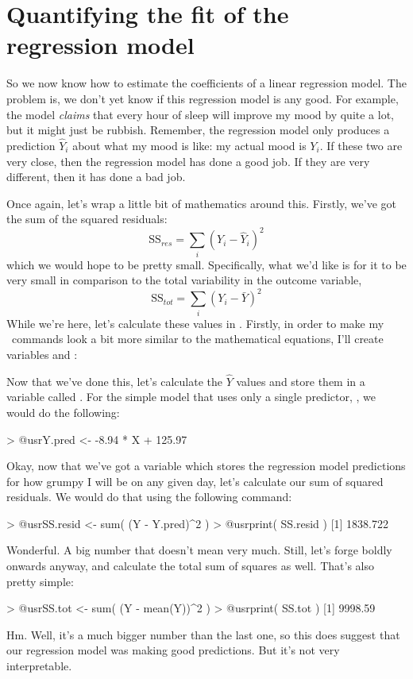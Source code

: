 \section{Quantifying the fit of the regression model~\label{sec:r2}}

So we now know how to estimate the coefficients of a linear regression model. The problem is, we don't yet know if this regression model is any good. For example, the  model {\it claims} that every hour of sleep will improve my mood by quite a lot, but it might just be rubbish. Remember, the regression model only produces a prediction $\hat{Y}_i$ about what my mood is like: my actual mood is $Y_i$. If these two are very close, then the regression model has done a good job. If they are very different, then it has done a bad job. 


Once again, let's wrap a little bit of mathematics around this. Firstly, we've got the sum of the squared residuals:
$$
\mbox{SS}_{res} = \sum_i (Y_i - \hat{Y}_i)^2
$$
which we would hope to be pretty small. Specifically, what we'd like is for it to be very small in comparison to the total variability in the outcome variable, 
$$
\mbox{SS}_{tot} = \sum_i (Y_i - \bar{Y})^2
$$
While we're here, let's calculate these values in \R. Firstly, in order to make my \R\ commands look a bit more similar to the mathematical equations, I'll create variables  and :
Now that we've done this, let's calculate the $\hat{Y}$ values and store them in a variable called . For the simple model that uses only a single predictor, , we would do the following:
\begin{rblock1}
> @usr{Y.pred <- -8.94 * X  +  125.97}
\end{rblock1}
Okay, now that we've got a variable which stores the regression model predictions for how grumpy I will be on any given day, let's calculate our sum of squared residuals. We would do that using the following command:
\begin{rblock1}
> @usr{SS.resid <- sum( (Y - Y.pred)^2 )}
> @usr{print( SS.resid )}
[1] 1838.722
\end{rblock1}
Wonderful. A big number that doesn't mean very much. Still, let's forge boldly onwards anyway, and calculate the total sum of squares as well. That's also pretty simple:
\begin{rblock1}
> @usr{SS.tot <- sum( (Y - mean(Y))^2 )}
> @usr{print( SS.tot )}
[1] 9998.59
\end{rblock1}
Hm. Well, it's a much bigger number than the last one, so this does suggest that our regression model was making good predictions. But it's not very interpretable. 

